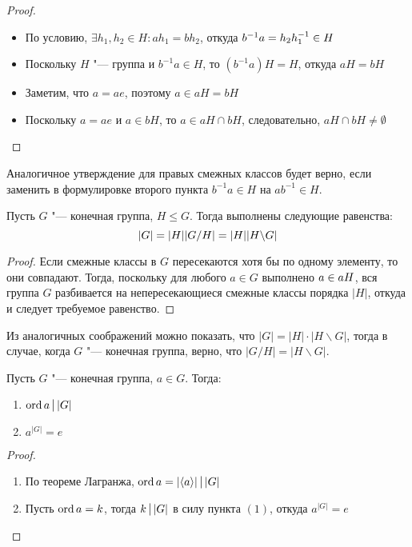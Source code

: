 \begin{proof}~
	\begin{itemize}
		\item{} По условию, $\exists h_1, h_2 \in H: ah_1 = bh_2$, откуда $b^{-1}a \hm= h_2h_1^{-1} \in H$
		\item{} Поскольку $H$ "--- группа и $b^{-1}a \in H$, то $(b^{-1}a)H = H$, откуда $aH = bH$
		\item{} Заметим, что $a = ae$, поэтому $a \in aH = bH$
		\item{} Поскольку $a = ae$ и $a \in bH$, то $a \in aH \cap bH$, следовательно, $aH \cap bH \ne \emptyset$\qedhere
	\end{itemize}
\end{proof}

\begin{note}
	Аналогичное утверждение для правых смежных классов будет верно, если заменить в формулировке второго пункта $b^{-1}a \in H$ на $ab^{-1} \in H$.
\end{note}

\begin{theorem}[Лагранжа]
	Пусть $G$ "--- конечная группа, $H \le G$. Тогда выполнены следующие равенства:
	\[|G| = |H||G / H| \hm= |H||H \bs G|\]
\end{theorem}

\begin{proof}
	Если смежные классы в $G$ пересекаются хотя бы по одному элементу, то они совпадают. Тогда, поскольку для любого $a \in G$ выполнено $a \hm\in aH$, вся группа $G$ разбивается на непересекающиеся смежные классы порядка $|H|$, откуда и следует требуемое равенство.
\end{proof}

\begin{note}
	Из аналогичных соображений можно показать, что $|G| = |H|\cdot|H\backslash G|$, тогда в случае, когда $G$ "--- конечная группа, верно, что $|G / H| = |H\backslash G|$.
\end{note}

\begin{corollary}
	Пусть $G$ "--- конечная группа, $a \in G$. Тогда:
	\begin{enumerate}
		\item $\ord{a} \Mid |G|$
		\item $a^{|G|} = e$
	\end{enumerate}
\end{corollary}

\begin{proof}~
	\begin{enumerate}
		\item По теореме Лагранжа, $\ord{a} = |\langle a\rangle| \Mid |G|$
		\item Пусть $\operatorname{ord}{a} = k$, тогда $k \Mid |G|$ в силу пункта $(1)$, откуда $a^{|G|} = e$\qedhere
	\end{enumerate}
\end{proof}

